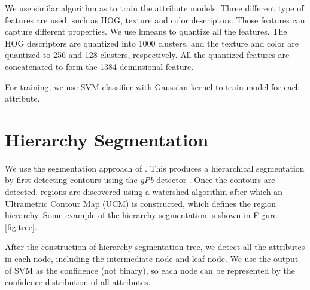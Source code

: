 \documentclass[10pt,twocolumn,letterpaper]{article}
\begin{document}
We use similar algorithm as \cite{farhadi09} to train the attribute models. Three different type of features are used, such as HOG, texture and color descriptors\cite{farhadi09}. Those features can capture different properties. We use kmeans to quantize all the features. The HOG descriptors are quantized into 1000 clusters, and the texture and color are quantized to 256 and 128 clusters, respectively. All the quantized features are concatenated to form the 1384 deminsional feature.

For training, we use SVM classifier with Gaussian kernel to train
model for each attribute.




\section{Hierarchy Segmentation}
\label{sec:segmentation}

We use the segmentation approach of \cite{arbelaez09}.  This
produces a hierarchical segmentation by first detecting contours
using the \emph{gPb} detector \cite{maire08}.  Once the contours are
detected, regions are discovered using a watershed algorithm after
which an Ultrametric Contour Map (UCM) is constructed, which defines
the region hierarchy. Some example of the hierarchy segmentation is
shown in Figure \ref{fig:tree}.

After the construction of hierarchy segmentation tree, we detect all
the attributes in each node, including the intermediate node and
leaf node. We use the output of SVM as the confidence (not binary),
so each node can be represented by the confidence distribution of
all attributes.
\end{document}
